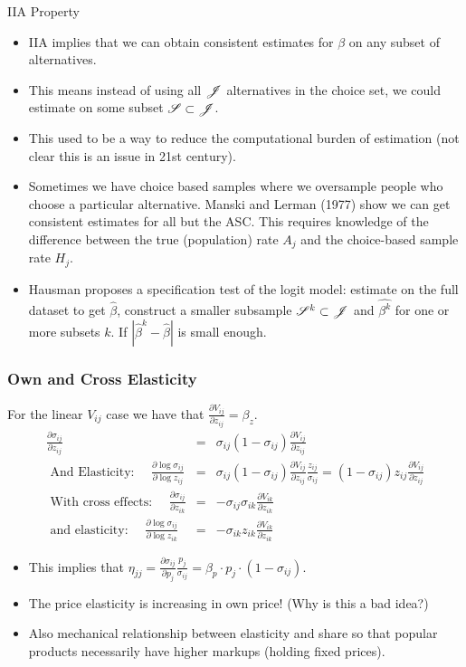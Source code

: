 \documentclass[aspectratio=169,11pt]{beamer}
\begin{document}
\begin{frame}{IIA Property}
\begin{itemize}
\item IIA implies that we can obtain consistent estimates for $\beta$ on any subset of alternatives.
\item This means instead of using all $\mathscr{J}$ alternatives in the choice set, we could estimate on some subset $\mathscr{S} \subset \mathscr{J}$.
\item This used to be a way to reduce the computational burden of estimation (not clear this is an issue in 21st century).
\item Sometimes we have \alert{choice based samples} where we oversample people who choose a particular alternative. Manski and Lerman (1977) show we can get consistent estimates for all but the ASC. This requires knowledge of the difference between the true (population) rate $A_j$ and the choice-based sample rate $H_j$.
\item Hausman proposes a specification test of the logit model: estimate on the full dataset to get $\hat{\beta}$, construct a smaller subsample $\mathscr{S}^k \subset \mathscr{J}$ and $\hat{\beta^k}$ for one or more subsets $k$. If $|\hat{\beta}^k - \hat{\beta}|$ is small enough.
\end{itemize}
\end{frame}

\begin{frame}
\frametitle{Own and Cross Elasticity}
\footnotesize
For the linear $V_{ij}$ case we have that $\frac{\partial V_{ij}}{\partial z_{ij}}=  \beta_z$.
\begin{eqnarray*}
\frac{\partial \sigma_{ij}}{\partial z_{ij}} &=& \sigma_{ij}(1- \sigma_{ij}) \frac{\partial V_{ij}}{\partial z_{ij}}\\
\text{ And Elasticity: }\quad  \frac{ \partial \log \sigma_{ij}}{ \partial \log z_{ij}} &=& \sigma_{ij}(1- \sigma_{ij}) \frac{\partial V_{ij}}{\partial z_{ij}} \frac{z_{ij}}{\sigma_{ij}} = (1- \sigma_{ij}) z_{ij} \frac{\partial V_{ij}}{\partial z_{ij}}\\
\text{ With cross effects: }\quad \frac{\partial \sigma_{ij}}{\partial z_{ik}} &=& -\sigma_{ij} \sigma_{ik} \frac{\partial V_{ik}}{\partial z_{ik}}\\
\text{ and elasticity: }\quad \frac{ \partial \log \sigma_{ij}}{ \partial \log z_{ik}} &=& -\sigma_{ik} z_{ik} \frac{\partial V_{ik}}{\partial z_{ik}}
\end{eqnarray*}
\begin{itemize}
\item This implies that $ \eta_{jj} = \frac{\partial \sigma_{ij}}{\partial p_j} \frac{p_j}{\sigma_{ij}}  = \beta_p \cdot p_j \cdot (1-\sigma_{ij})$.
\item The price elasticity is increasing in own price! (Why is this a bad idea?)
\item Also mechanical relationship between elasticity and \alert{share} so that popular products necessarily have higher markups (holding fixed prices).
\end{itemize}
\end{frame}
\end{document}
